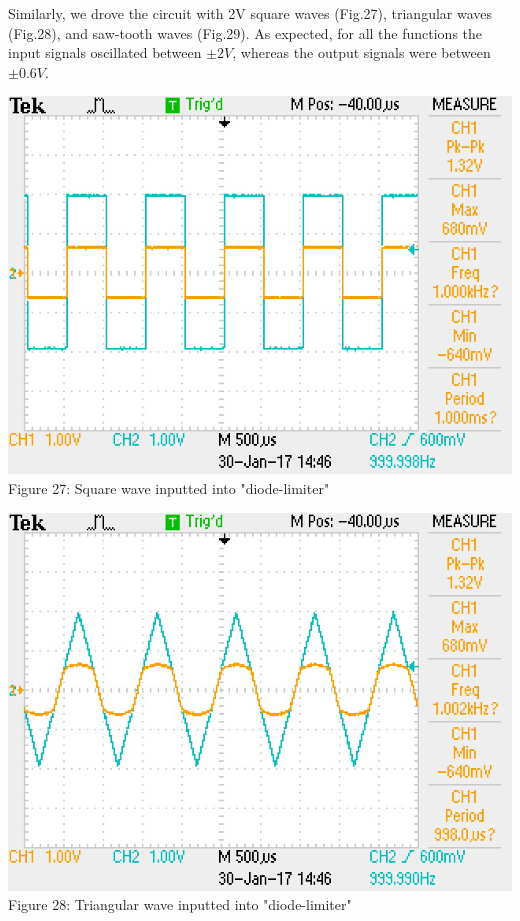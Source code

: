 \documentclass[]{article}
\begin{document}
	Similarly, we drove the circuit with 2V square waves (Fig.27), triangular waves (Fig.28), and saw-tooth waves (Fig.29). As expected, for all the functions the input signals oscillated between $\pm 2V$, whereas the output signals were between $\pm 0.6V$.
\begin{center}
	\includegraphics[scale=0.8]{l_square}\\
	Figure 27: Square wave inputted into "diode-limiter" 
\end{center}

\begin{center}
	\includegraphics[scale=0.8]{l_triangle}\\
	Figure 28: Triangular wave inputted into "diode-limiter" 
\end{center}
\end{document}
